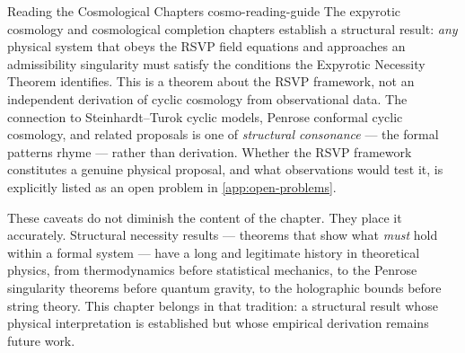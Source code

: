 \documentclass[12pt,twoside,openright]{book}
\begin{document}
\begin{remark}{Reading the Cosmological Chapters}%
  {cosmo-reading-guide}
  The expyrotic cosmology and cosmological completion
  chapters establish a structural result: \emph{any} physical
  system that obeys the RSVP field equations and approaches
  an admissibility singularity must satisfy the conditions
  the Expyrotic Necessity Theorem identifies. This is a
  theorem about the RSVP framework, not an independent
  derivation of cyclic cosmology from observational data.
  The connection to Steinhardt--Turok cyclic models, Penrose
  conformal cyclic cosmology, and related proposals is one
  of \emph{structural consonance} --- the formal patterns
  rhyme --- rather than derivation. Whether the RSVP
  framework constitutes a genuine physical proposal, and
  what observations would test it, is explicitly listed as
  an open problem in \cref{app:open-problems}.
\end{remark}

These caveats do not diminish the content of the chapter.
They place it accurately. Structural necessity results ---
theorems that show what \emph{must} hold within a formal
system --- have a long and legitimate history in
theoretical physics, from thermodynamics before statistical
mechanics, to the Penrose singularity theorems before
quantum gravity, to the holographic bounds before string
theory. This chapter belongs in that tradition: a
structural result whose physical interpretation is
established but whose empirical derivation remains future
work.
\end{document}
